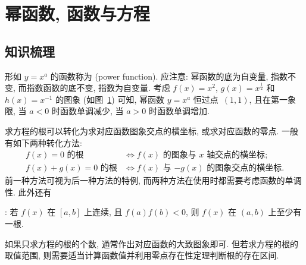   \section{幂函数, 函数与方程}

  \subsection{知识梳理}
  形如 $y=x^a$ 的函数称为 (power function). 应注意: 幂函数的底为自变量, 指数不变, 
  而指数函数的底不变, 指数为自变量. 考虑 $f(x)=x^2$, $g(x)=x^{\frac12}$ 
  和 $h(x)=x^{-1}$ 的图象 (如图~\ref{fig-190216-2250}) 可知, 
  幂函数 $y=x^a$ 恒过点~$(1,1)$, 且在第一象限, 
  当 $a<0$ 时函数单调减少, 当 $a>0$ 时函数单调增加.
  \begin{figure}[htb]
    \centering\small
    \caption{}\label{fig-190216-2250}
  \end{figure}

  求方程的根可以转化为求对应函数图象交点的横坐标, 或求对应函数的零点. 
  一般有如下两种转化方法:
  \begin{align*}
    f(x)=0\text{\ 的根}&\Leftrightarrow 
      \text{$f(x)$ 的图象与 $x$ 轴交点的横坐标};\\
    f(x)+g(x)=0\text{\ 的根}&\Leftrightarrow 
      \text{$f(x)$ 与 $-g(x)$ 的图象交点的横坐标}.
  \end{align*}
  前一种方法可视为后一种方法的特例, 而两种方法在使用时都需要考虑函数的单调性.
  此外还有
  
  : 若 $f(x)$ 在 $[a,b]$ 上连续, 且 $f(a)f(b)<0$, 
  则 $f(x)$ 在 $(a,b)$ 上至少有一根. 
  
  如果只求方程的根的个数, 通常作出对应函数的大致图象即可. 但若求方程的根的取值范围, 则需要适当计算函数值并利用零点存在性定理判断根的存在区间.

